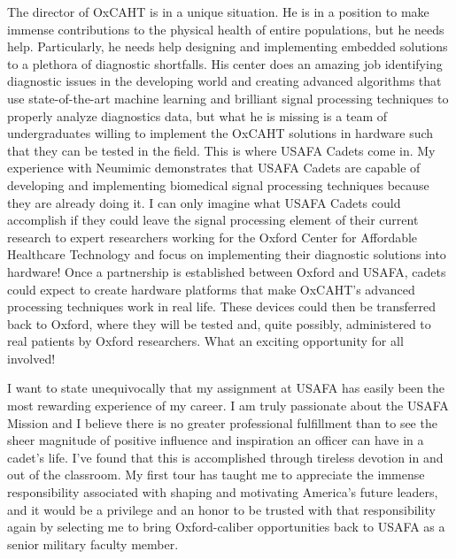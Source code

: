 \documentclass{article}
\begin{document}
The director of OxCAHT is in a unique situation. He is in a position to make
immense contributions to the physical health of entire populations, but he needs
help. Particularly, he needs help designing and implementing embedded solutions
to a plethora of diagnostic shortfalls. His center does an amazing job
identifying diagnostic issues in the developing world and creating advanced algorithms that use
state-of-the-art machine learning and brilliant signal processing techniques to
properly analyze diagnostics data, but what he is missing is a team of
undergraduates willing to implement the OxCAHT solutions in hardware such that
they can be tested in the field. This is where USAFA Cadets come in. My experience with 
Neumimic demonstrates that USAFA Cadets are capable of developing and implementing biomedical 
signal processing techniques because they are already doing it. I can only
imagine what USAFA Cadets could accomplish if they could leave the signal processing element
of their current research to expert researchers working for the Oxford Center 
for Affordable Healthcare Technology and focus on implementing their diagnostic 
solutions into hardware! Once a partnership is established between Oxford and USAFA,
cadets could expect to create hardware platforms that make OxCAHT's advanced processing techniques
work in real life. These devices could then be transferred back to Oxford,
where they will be tested and, quite possibly, administered to real patients by Oxford researchers.
What an exciting opportunity for all involved!
 
I want to state unequivocally that my assignment at USAFA has easily been the
most rewarding experience of my career. I am truly passionate about the USAFA
Mission and I believe there is no greater professional fulfillment than to see
the sheer magnitude of positive influence and inspiration an officer can have
in a cadet's life. I've found that this is accomplished through tireless
devotion in and out of the classroom. My first tour has taught me to appreciate
the immense responsibility associated with shaping and motivating America's
future leaders, and it would be a privilege and an honor to be trusted with
that responsibility again by selecting me to bring Oxford-caliber opportunities
back to USAFA as a senior military faculty member.
 
\end{document}
